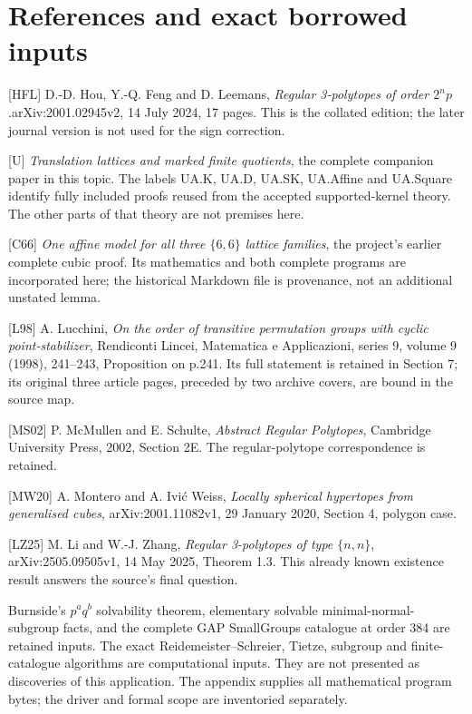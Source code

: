 \section*{References and exact borrowed inputs}
[HFL] D.-D. Hou, Y.-Q. Feng and D. Leemans, \emph{Regular 3-polytopes of order $2^n p$}.\newline arXiv:2001.02945v2, 14 July 2024, 17 pages. This is the collated edition; the later journal version is not used for the sign correction.

[U] \emph{Translation lattices and marked finite quotients}, the complete companion paper in this topic. The labels UA.K, UA.D, UA.SK, UA.Affine and UA.Square identify fully included proofs reused from the accepted supported-kernel theory. The other parts of that theory are not premises here.

[C66] \emph{One affine model for all three $\{6,6\}$ lattice families}, the project's earlier complete cubic proof. Its mathematics and both complete programs are incorporated here; the historical Markdown file is provenance, not an additional unstated lemma.

[L98] A. Lucchini, \emph{On the order of transitive permutation groups with cyclic point-stabilizer}, Rendiconti Lincei, Matematica e Applicazioni, series 9, volume 9 (1998), 241--243, Proposition on p.241. Its full statement is retained in Section 7; its original three article pages, preceded by two archive covers, are bound in the source map.

[MS02] P. McMullen and E. Schulte, \emph{Abstract Regular Polytopes}, Cambridge University Press, 2002, Section 2E. The regular-polytope correspondence is retained.

[MW20] A. Montero and A. Ivi\'c Weiss, \emph{Locally spherical hypertopes from generalised cubes}, arXiv:2001.11082v1, 29 January 2020, Section 4, polygon case.

[LZ25] M. Li and W.-J. Zhang, \emph{Regular 3-polytopes of type $\{n,n\}$}, arXiv:2505.09505v1, 14 May 2025, Theorem 1.3. This already known existence result answers the source's final question.

Burnside's $p^a q^b$ solvability theorem, elementary solvable minimal-normal-subgroup facts, and the complete GAP SmallGroups catalogue at order 384 are retained inputs. The exact Reidemeister--Schreier, Tietze, subgroup and finite-catalogue algorithms are computational inputs. They are not presented as discoveries of this application. The appendix supplies all mathematical program bytes; the driver and formal scope are inventoried separately.
